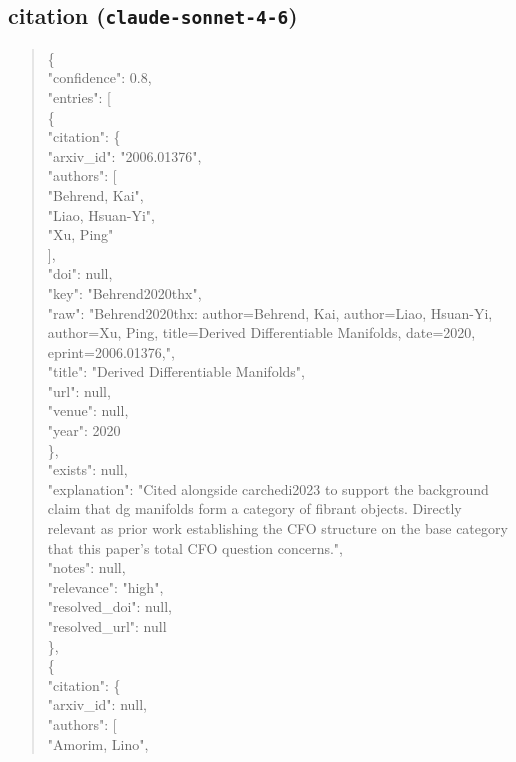 \documentclass[11pt]{article}
\begin{document}
\subsection*{citation (\texttt{claude-sonnet-4-6})}
\begin{quote}\small\ttfamily\raggedright
\{\\
  "confidence": 0.8,\\
  "entries": [\\
    \{\\
      "citation": \{\\
        "arxiv\_id": "2006.01376",\\
        "authors": [\\
          "Behrend, Kai",\\
          "Liao, Hsuan-Yi",\\
          "Xu, Ping"\\
        ],\\
        "doi": null,\\
        "key": "Behrend2020thx",\\
        "raw": "Behrend2020thx: author=Behrend, Kai, author=Liao, Hsuan-Yi, author=Xu, Ping, title=Derived Differentiable Manifolds, date=2020, eprint=2006.01376,",\\
        "title": "Derived Differentiable Manifolds",\\
        "url": null,\\
        "venue": null,\\
        "year": 2020\\
      \},\\
      "exists": null,\\
      "explanation": "Cited alongside carchedi2023 to support the background claim that dg manifolds form a category of fibrant objects. Directly relevant as prior work establishing the CFO structure on the base category that this paper's total CFO question concerns.",\\
      "notes": null,\\
      "relevance": "high",\\
      "resolved\_doi": null,\\
      "resolved\_url": null\\
    \},\\
    \{\\
      "citation": \{\\
        "arxiv\_id": null,\\
        "authors": [\\
          "Amorim, Lino",\\

\end{quote}
\end{document}
